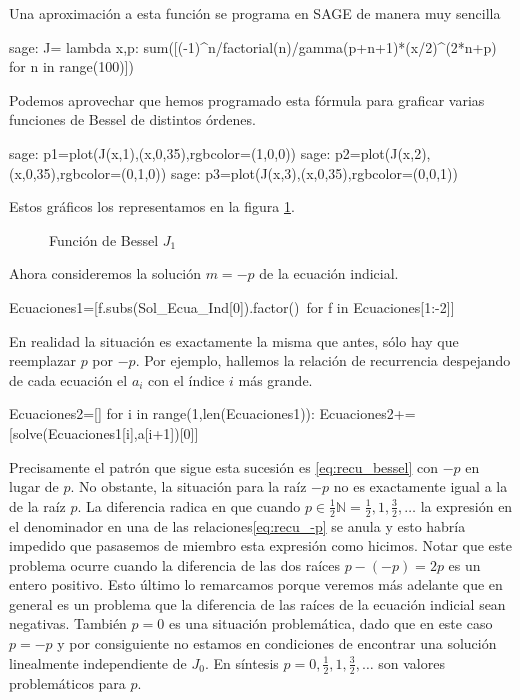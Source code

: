 \documentclass{article}
\newcounter{lem_cont}
\newcounter{ejem_cont}
\begin{document}
Una aproximación a esta función se programa en SAGE de manera muy sencilla
\begin{sagecommandline}
sage: J= lambda x,p: sum([(-1)^n/factorial(n)/gamma(p+n+1)*(x/2)^(2*n+p) for n in range(100)])
\end{sagecommandline}
Podemos aprovechar que hemos programado esta fórmula para graficar varias funciones de Bessel de distintos órdenes.
\begin{sagecommandline}
sage: p1=plot(J(x,1),(x,0,35),rgbcolor=(1,0,0))
sage: p2=plot(J(x,2),(x,0,35),rgbcolor=(0,1,0))
sage: p3=plot(J(x,3),(x,0,35),rgbcolor=(0,0,1))
\end{sagecommandline}
Estos gráficos los representamos en la figura \ref{fig:bessel}.

\begin{figure}[h]
\begin{center}
\end{center}
\caption{Función de Bessel $J_1$}\label{fig:bessel}

\end{figure}





Ahora consideremos la solución $m=-p$ de la ecuación indicial.
\begin{sageblock}
Ecuaciones1=[f.subs(Sol_Ecua_Ind[0]).factor()\
for f in Ecuaciones[1:-2]]
\end{sageblock}
En realidad la situación es exactamente la misma que antes, sólo hay que reemplazar $p$ por $-p$. Por ejemplo, hallemos la relación de recurrencia despejando de cada ecuación el $a_i$ con el índice $i$ más grande. 
\begin{sageblock}
Ecuaciones2=[]
for i in range(1,len(Ecuaciones1)):
    Ecuaciones2+=[solve(Ecuaciones1[i],a[i+1])[0]]
 \end{sageblock}
Precisamente el patrón que sigue esta sucesión es \eqref{eq:recu_bessel} con $-p$ en lugar de $p$. No obstante, la situación para la raíz $-p$ no es exactamente igual a la de la raíz $p$. La diferencia radica en que cuando $p\in\frac12\mathbb{N}=\frac12,1,\frac32,\ldots$  la expresión en el denominador en una de las relaciones\eqref{eq:recu_-p} se anula y esto  habría impedido que pasasemos de miembro esta expresión como hicimos. Notar que este problema ocurre cuando la diferencia de las dos raíces $p-(-p)=2p$ es un entero positivo.  Esto último lo remarcamos porque veremos más adelante que en general es un problema que la diferencia de las raíces de la ecuación indicial sean negativas. También $p=0$ es una situación problemática, dado que en este caso $p=-p$ y por consiguiente no estamos en condiciones de encontrar una solución linealmente independiente de $J_0$. En síntesis $p=0,\frac12,1,\frac32,\ldots$ son valores problemáticos para $p$. 
\end{document}
